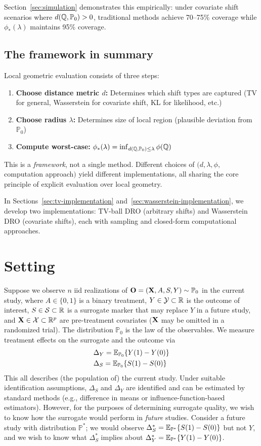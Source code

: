 \documentclass{article}
\newcommand{\PP}{\mathbb{P}}
\begin{document}
Section~\ref{sec:simulation} demonstrates this empirically: under covariate shift scenarios where $d(\Q, \PP_0) > 0$, traditional methods achieve 70--75\% coverage while $\phi_*(\lambda)$ maintains 95\% coverage.

\subsection{The framework in summary}

Local geometric evaluation consists of three steps:
\begin{enumerate}
    \item \textbf{Choose distance metric $d$:} Determines which shift types are captured (TV for general, Wasserstein for covariate shift, KL for likelihood, etc.)
    \item \textbf{Choose radius $\lambda$:} Determines size of local region (plausible deviation from $\PP_0$)
    \item \textbf{Compute worst-case:} $\phi_*(\lambda) = \inf_{d(\Q,\PP_0) \leq \lambda} \phi(\Q)$
\end{enumerate}

This is a \emph{framework}, not a single method. Different choices of $(d, \lambda, \phi,$computation approach$)$ yield different implementations, all sharing the core principle of explicit evaluation over local geometry.

In Sections~\ref{sec:tv-implementation} and~\ref{sec:wasserstein-implementation}, we develop two implementations: TV-ball DRO (arbitrary shifts) and Wasserstein DRO (covariate shifts), each with sampling and closed-form computational approaches.

\section{Setting}\label{sec:setting}
Suppose we observe $n$ iid realizations of $\bO = (\bX, A, S, Y) \sim \PP_0$ in the current study, where $A \in \{0, 1\}$ is a binary treatment, $Y \in \mathcal{Y} \subset \mathbb{R}$ is the outcome of interest, $S \in \mathcal{S} \subset \mathbb{R}$ is a surrogate marker that may replace $Y$ in a future study, and $\mathbf{X} \in \mathcal{X} \subset \mathbb{R}^p$ are pre-treatment covariates ($\mathbf{X}$ may be omitted in a randomized trial). The distribution $\PP_0$ is the law of the observables. We measure treatment effects on the surrogate and the outcome via
\begin{align*}
    &\Delta_Y = \E_{\PP_0}\{Y(1) - Y(0)\}\\
    &\Delta_S = \E_{\PP_0}\{S(1) - S(0)\}
\end{align*}
This all describes (the population of) the current study. Under suitable identification assumptions, $\Delta_S$ and $\Delta_Y$ are identified and can be estimated by standard methods (e.g., difference in means or influence-function-based estimators). However, for the purposes of determining surrogate quality, we wish to know how the surrogate would perform in \emph{future} studies. Consider a future study with distribution $\PP^*$; we would observe $\Delta^*_S = \E_{\PP^*}\{S(1) - S(0)\}$ but not $Y$, and we wish to know what $\Delta^*_S$ implies about $\Delta^*_Y = \E_{\PP^*}\{Y(1) - Y(0)\}$. 
\end{document}
